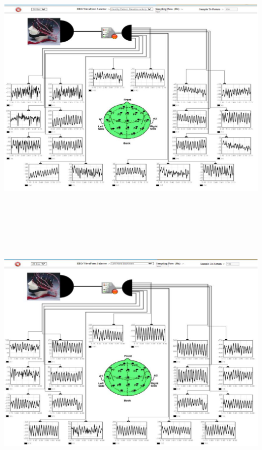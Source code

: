 \documentclass[
  11pt,
  letterpaper,
  DIV=11,
  numbers=noendperiod]{scrreprt}
\begin{document}
\begin{center}
\includegraphics[width=5.6875in,height=5.28125in]{images/clipboard-2845690509.png}
\end{center}

\begin{center}
\includegraphics[width=5.66667in,height=4.89583in]{images/clipboard-8096195.png}
\end{center}
\end{document}
